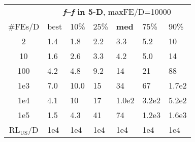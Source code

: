 \begin{tabular}{c|llllll}
 & \multicolumn{6}{|c}{\textbf{\textit{f}\raisebox{-0.35ex}{1}--\textit{f}\raisebox{-0.35ex}{24} in 5-D}, maxFE/D=10000}\\
\#FEs/D & best & 10\% & 25\% & \textbf{med} & 75\% & 90\%\\
2 & \hspace*{1ex}1.4 & \hspace*{1ex}1.8 & \hspace*{1ex}2.2 & \hspace*{1ex}3.3 & \hspace*{1ex}5.2 & 10\\
10 & \hspace*{1ex}1.6 & \hspace*{1ex}2.6 & \hspace*{1ex}3.3 & \hspace*{1ex}4.2 & \hspace*{1ex}5.0 & 14\\
100 & \hspace*{1ex}4.2 & \hspace*{1ex}4.8 & \hspace*{1ex}9.2 & 14 & 21 & 88\\
1e3 & \hspace*{1ex}7.0 & \hspace*{1ex}10.0 & 15 & 34 & 67 & 1.7e2\\
1e4 & \hspace*{1ex}4.1 & 10 & 17 & 1.0e2 & 3.2e2 & 5.2e2\\
1e5 & \hspace*{1ex}1.5 & \hspace*{1ex}4.3 & 41 & 74 & 1.2e3 & 1.6e3\\
$\text{RL}_{\text{US}}$/D & 1e4 & 1e4 & 1e4 & 1e4 & 1e4 & 1e4
\end{tabular}
